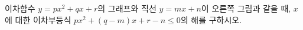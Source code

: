 \hspace*{2mm}\begin{minipage}[t]{\dimexpr\linewidth-2mm\relax}\vspace{0pt}
\noindent\begin{minipage}[t]{0.58\linewidth}\vspace{0pt}\raggedright 이차함수 $y=px^2+qx+r$의 그래프와 직선 $y=mx+n$이 오른쪽 그림과 같을 때, $x$에 대한 이차부등식 $px^2+(q-m)x+r-n\le 0$의 해를 구하시오. \end{minipage}\hfill\begin{minipage}[t]{0.4\linewidth}\vspace{0pt}\centering \resizebox{\ifdim\width>\linewidth\linewidth\else\width\fi}{!}{}\end{minipage}\par\end{minipage}
